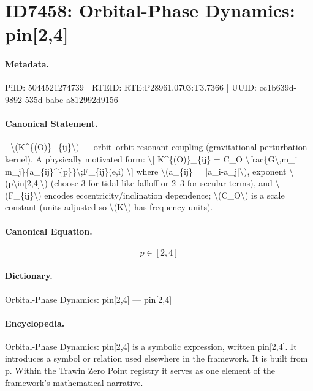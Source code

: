 \section*{ID7458: Orbital-Phase Dynamics: pin[2,4]}
\paragraph{Metadata.}
PiID: 5044521274739 | RTEID: RTE:P28961.0703:T3.7366 | UUID: cc1b639d-9892-535d-babe-a812992d9156

\paragraph{Canonical Statement.}
- \textbackslash{}(K\textasciicircum{}\{(O)\}\_\{ij\}\textbackslash{}) — orbit–orbit resonant coupling (gravitational perturbation kernel). A physically motivated form: \textbackslash{}[ K\textasciicircum{}\{(O)\}\_\{ij\} = C\_O \textbackslash{}frac\{G\textbackslash{},m\_i m\_j\}\{a\_\{ij\}\textasciicircum{}\{p\}\}\textbackslash{};F\_\{ij\}(e,i) \textbackslash{}] where \textbackslash{}(a\_\{ij\} = |a\_i-a\_j|\textbackslash{}), exponent \textbackslash{}(p\textbackslash{}in[2,4]\textbackslash{}) (choose 3 for tidal-like falloff or 2–3 for secular terms), and \textbackslash{}(F\_\{ij\}\textbackslash{}) encodes eccentricity/inclination dependence; \textbackslash{}(C\_O\textbackslash{}) is a scale constant (units adjusted so \textbackslash{}(K\textbackslash{}) has frequency units).

\paragraph{Canonical Equation.}
\[
p\in[2,4]
\]

\paragraph{Dictionary.}
Orbital-Phase Dynamics: pin[2,4] — pin[2,4]

\paragraph{Encyclopedia.}
Orbital-Phase Dynamics: pin[2,4] is a symbolic expression, written pin[2,4]. It introduces a symbol or relation used elsewhere in the framework. It is built from p. Within the Trawin Zero Point registry it serves as one element of the framework's mathematical narrative.
